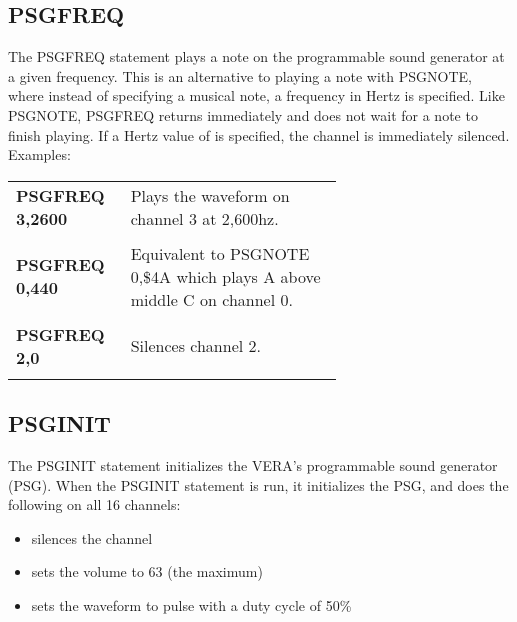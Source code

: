\subsection{PSGFREQ}

The {\ttfamily PSGFREQ} statement plays a note on the programmable sound
generator at a given frequency.  This is an alternative to playing a note with
{\ttfamily PSGNOTE}, where instead of specifying a musical note, a frequency in
Hertz is specified.  Like {\ttfamily PSGNOTE}, {\ttfamily PSGFREQ} returns
immediately and does not wait for a note to finish playing.  If a Hertz value
of {} is specified, the channel is immediately silenced.\\

Examples:\\

\begin{tabular}{l p{0.65\linewidth}}

	{\ttfamily\bfseries PSGFREQ 3,2600}&Plays the waveform on channel 3 at 2,600hz.\\\\

	{\ttfamily\bfseries PSGFREQ 0,440}&Equivalent to {\ttfamily PSGNOTE 0,\$4A}
	which plays A above middle C on channel 0.\\\\

	{\ttfamily\bfseries PSGFREQ 2,0}&Silences channel 2.\\\\

\end{tabular}

\subsection{PSGINIT}

The {\ttfamily PSGINIT} statement initializes the VERA's programmable sound
generator (PSG).  When the {\ttfamily PSGINIT} statement is run, it initializes
the PSG, and does the following on all 16 channels:\\

\begin{itemize}

	\item silences the channel

	\item sets the volume to 63 (the maximum)

	\item sets the waveform to pulse with a duty cycle of 50\%

\end{itemize}

